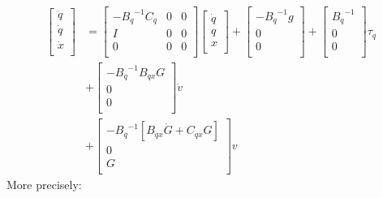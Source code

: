 \begin{equation}
	\begin{split}
		\left[\begin{matrix}\ddot{q}\\\dot{q}\\\dot{x}\\\end{matrix}\right]&=\left[\begin{matrix}-{B_q}^{-1}C_q&0&0\\I&0&0\\0&0&0\\\end{matrix}\right]\left[\begin{matrix}\dot{q}\\q\\x\\\end{matrix}\right]+\left[\begin{matrix}{{-B}_q}^{-1}g\\0\\0\\\end{matrix}\right]+\left[\begin{matrix}{B_q}^{-1}\\0\\0\\\end{matrix}\right]\tau_q\\&+\left[\begin{matrix}-{B_q}^{-1}B_{qx}G\\0\\0\\\end{matrix}\right]\dot{v}\\&+\left[\begin{matrix}-{B_q}^{-1}\left[B_{qx}\dot{G}+C_{qx}G\right]\\0\\G\\\end{matrix}\right]v 
	\end{split}
\end{equation}
More precisely:
